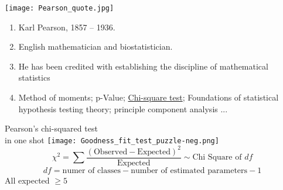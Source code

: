 \begin{frame}
	\centering
	\texttt{[image: Pearson\_quote.jpg]}
	\vfill
	\begin{enumerate}
		\item Karl Pearson, 1857 -- 1936.
		\item English mathematician and biostatistician.
		\item He has been credited with establishing the discipline of mathematical statistics
		\item Method of moments; p-Value; \underline{Chi-square test}; Foundations of statistical hypothesis testing theory; principle component analysis ...
	\end{enumerate}
\end{frame}
\begin{frame}
\centering
Pearson's chi-squared test\\ in one shot
\vfill
\texttt{[image: Goodness\_fit\_test\_puzzle-neg.png]}
\vfill
\[
	\chi^2 =\sum  \frac{ \left( \text{Observed} - \text{Expected} \right)^2 }{\text{Expected}} \sim \text{Chi Square of $df$}
\]
\vfill
\[
	df = \text{numer of classes} -\text{number of estimated parameters} - 1
\]
\vfill
All expected $\ge 5$
\end{frame}
